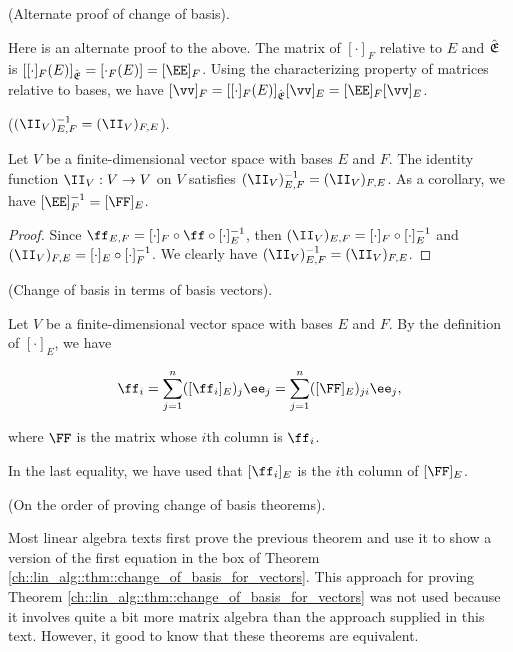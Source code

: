 \begin{remark}
    (Alternate proof of change of basis).
    
    Here is an alternate proof to the above. The matrix of $[\cdot]_F$ relative to $E$ and ${\hat{\mathfrak{E}}}$ is $[[\cdot]_F(E)]_\sE = [\cdot_F(E)] = [\EE]_F$. Using the characterizing property of matrices relative to bases, we have $[\vv]_F = [[\cdot]_F(E)]_\sE [\vv]_E = [\EE]_F [\vv]_E$.
\end{remark}

\begin{theorem}
\label{ch::lin_alg::thm::I_EF}
    ($(\II_V)_{E,F}^{-1} = (\II_V)_{F,E}$).
    
    Let $V$ be a finite-dimensional vector space with bases $E$ and $F$. The identity function $\II_V:V \rightarrow V$ on $V$ satisfies $(\II_V)_{E,F}^{-1} = (\II_V)_{F,E}$. As a corollary, we have $[\EE]_F^{-1} = [\FF]_E$.
\end{theorem}

\begin{proof}
    Since $\ff_{E,F} = [\cdot]_F \circ \ff \circ [\cdot]_E^{-1}$, then $(\II_V)_{E,F} = [\cdot]_F \circ [\cdot]_E^{-1}$ and $(\II_V)_{F,E} = [\cdot]_E \circ [\cdot]_F^{-1}$. We clearly have $(\II_V)_{E,F}^{-1} = (\II_V)_{F,E}$.
\end{proof}

\begin{theorem}
\label{ch::lin_alg::thm::change_of_basis_with_basis_vectors}
    (Change of basis in terms of basis vectors).
    
    Let $V$ be a finite-dimensional vector space with bases $E$ and $F$. By the definition of $[\cdot]_E$, we have
    
    \begin{align*}
        \ff_i = \sum_{j = 1}^n ([\ff_i]_E)_j \ee_j = \sum_{j = 1}^n ([\FF]_E)_{ji} \ee_j,
    \end{align*}
    
    where $\FF$ is the matrix whose $i$th column is $\ff_i$.
    
    In the last equality, we have used that $[\ff_i]_E$ is the $i$th column of $[\FF]_E$.
\end{theorem}

\begin{remark}
    (On the order of proving change of basis theorems). 
    
    Most linear algebra texts first prove the previous theorem and use it to show a version of the first equation in the box of Theorem \ref{ch::lin_alg::thm::change_of_basis_for_vectors}. This approach for proving Theorem \ref{ch::lin_alg::thm::change_of_basis_for_vectors} was not used because it involves quite a bit more matrix algebra than the approach supplied in this text. However, it good to know that these theorems are equivalent.
\end{remark}

